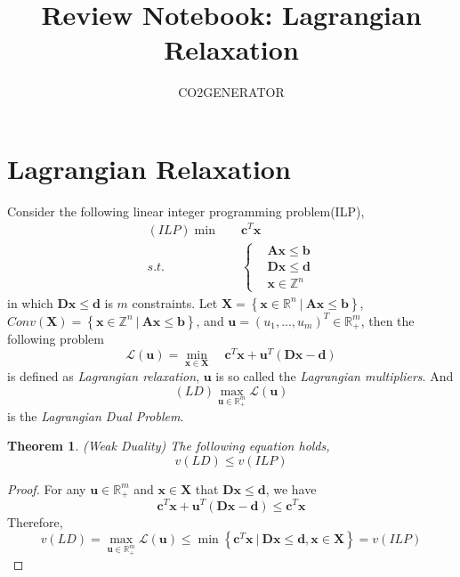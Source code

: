 \documentclass{article}
\title {Review Notebook: Lagrangian Relaxation}
\author{CO2GENERATOR}
\newtheorem{thm}{Theorem}
\begin{document}
\maketitle 
\allowdisplaybreaks[4]

\section{Lagrangian Relaxation}
 
Consider the following linear integer programming problem(ILP),
\begin{align}
	(\textit{ILP}) \min \quad & \bm{c}^T\bm{x} \\
	s.t. \quad & \left\{\begin{aligned}
	& \bm{A}\bm{x} \leq \bm{b} \\
	& \bm{D}\bm{x} \leq \bm{d} \\
	& \bm{x} \in \mathbb{Z}^n
	\end{aligned} \right.
\end{align}
in which $\bm{D} \bm{x} \leq \bm{d}$ is $m$ constraints. Let $\bm{X}= \left\{\bm{x} \in \mathbb{R}^n \ | \ \bm{A}\bm{x} \leq \bm{b}\right\}$, $Conv(\bm{X}) = \left\{\bm{x} \in \mathbb{Z}^n \ | \ \bm{A}\bm{x} \leq \bm{b}\right\}$, and $\bm{u} = (u_1, ..., u_m)^T \in \mathbb{R}_+^m$, then the following problem
\begin{equation}
	\mathcal{L}(\bm{u})  =  \min_{\bm{x} \in \bm{X}} \quad \bm{c}^T\bm{x} + \bm{u}^T(\bm{D}\bm{x} - \bm{d}) 
\end{equation}
 is defined as \textit{Lagrangian relaxation}, $\bm{u}$ is so called the \textit{Lagrangian multipliers}. And 
 \begin{equation}
 	(\textit{LD}) \max_{\bm{u} \in \mathbb{R}_+^m} \mathcal{L}(\bm{u})
 \end{equation}
 is the \textit{Lagrangian Dual Problem}.
 
 \begin{thm} 
 	(Weak Duality) The following equation holds,
 	\begin{equation}
 		v(LD) \leq v(ILP)
 	\end{equation}
 \end{thm}

\begin{proof}
	For any $\bm{u} \in \mathbb{R}_+^m$ and $\bm{x} \in \bm{X}$ that $\bm{Dx} \leq \bm{d}$, we have
	\begin{equation}
		\bm{c}^T \bm{x} + \bm{u}^T (\bm{Dx} - \bm{d}) \leq \bm{c}^T\bm{x}
	\end{equation}
	Therefore,
	\begin{equation}
		v(LD) = \max_{\bm{u} \in \mathbb{R}_+^m} \mathcal{L}(\bm{u}) \leq \min \left\{\bm{c}^T\bm{x} \ | \ \bm{D}\bm{x} \leq \bm{d}, \bm{x} \in \bm{X}\right\} = v(ILP)
	\end{equation}
\end{proof}
\end{document}
